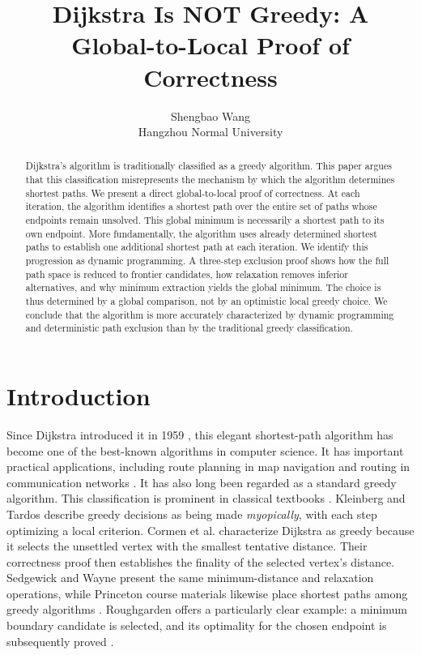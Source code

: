 \documentclass[11pt]{article}
\title{\textbf{Dijkstra Is NOT Greedy: A Global-to-Local Proof of Correctness}}
\author{Shengbao Wang\\\small Hangzhou Normal University}
\date{}
\begin{document}
\maketitle
\vspace{-2.5em}

\begin{abstract}
Dijkstra's algorithm is traditionally classified as a greedy algorithm. This paper argues that this classification misrepresents the mechanism by which the algorithm determines shortest paths. We present a direct global-to-local proof of correctness. At each iteration, the algorithm identifies a shortest path over the entire set of paths whose endpoints remain unsolved. This global minimum is necessarily a shortest path to its own endpoint. More fundamentally, the algorithm uses already determined shortest paths to establish one additional shortest path at each iteration. We identify this progression as dynamic programming. A three-step exclusion proof shows how the full path space is reduced to frontier candidates, how relaxation removes inferior alternatives, and why minimum extraction yields the global minimum. The choice is thus determined by a global comparison, not by an optimistic local greedy choice. We conclude that the algorithm is more accurately characterized by dynamic programming and deterministic path exclusion than by the traditional greedy classification.
\end{abstract}

\section{Introduction}
Since Dijkstra introduced it in 1959 \cite{Dijkstra1959}, this elegant shortest-path algorithm has become one of the best-known algorithms in computer science. It has important practical applications, including route planning in map navigation and routing in communication networks \cite{SedgewickWayne2011}. It has also long been regarded as a standard greedy algorithm. This classification is prominent in classical textbooks \cite{BrassardBratley1988,KleinbergTardos2006,CLRS2022}. Kleinberg and Tardos describe greedy decisions as being made \emph{myopically}, with each step optimizing a local criterion. Cormen et al. characterize Dijkstra as greedy because it selects the unsettled vertex with the smallest tentative distance. Their correctness proof then establishes the finality of the selected vertex's distance. Sedgewick and Wayne present the same minimum-distance and relaxation operations, while Princeton course materials likewise place shortest paths among greedy algorithms \cite{SedgewickWayne2011,WayneCOS423}. Roughgarden offers a particularly clear example: a minimum boundary candidate is selected, and its optimality for the chosen endpoint is subsequently proved \cite{Roughgarden2018}.
\end{document}
